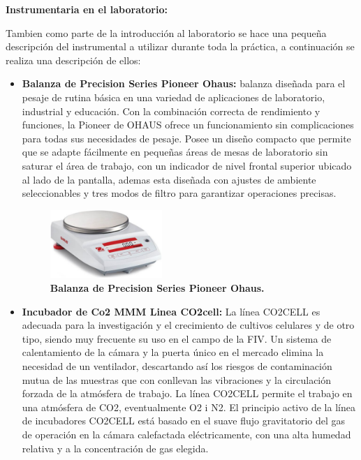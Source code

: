 \textbf{\textcolor{azul50}{Instrumentaria en el laboratorio:}}

Tambien como parte de la introducción al laboratorio se hace una pequeña descripción del instrumental a utilizar durante toda la práctica, a continuación se realiza una descripción de ellos:
 \begin{itemize}
     \item \textbf{\textbf{\textcolor{morado}{Balanza de Precision Series Pioneer Ohaus:}}} balanza diseñada para el pesaje de rutina básica en una variedad de aplicaciones de laboratorio, industrial y educación. Con la combinación correcta de rendimiento y funciones, la Pioneer de OHAUS ofrece un funcionamiento sin complicaciones para todas sus necesidades de pesaje. Posee un diseño compacto que permite que se adapte fácilmente en pequeñas áreas de mesas de laboratorio sin saturar el área de trabajo, con un indicador de nivel frontal superior ubicado al lado de la pantalla, ademas esta diseñada con ajustes de ambiente seleccionables y tres modos de filtro para garantizar operaciones precisas.%
     \begin{figure}
            \includegraphics[width=0.4\textwidth]{Tarea1/balanza.png}
        \caption{\textbf{Balanza de Precision Series Pioneer Ohaus.}}
        \label{balanza}
    \end{figure}
     \item \textbf{\textbf{\textcolor{morado}{Incubador de Co2 MMM Linea CO2cell:}}} La línea CO2CELL es adecuada para la investigación y el crecimiento de cultivos celulares y de otro tipo, siendo muy frecuente su uso en el campo de la FIV. Un sistema de calentamiento de la cámara y la puerta único en el mercado elimina la necesidad de un ventilador, descartando así los riesgos de contaminación mutua de las muestras que con conllevan las vibraciones y la circulación forzada de la atmósfera de trabajo. La línea CO2CELL permite el trabajo en una atmósfera de CO2, eventualmente O2 i N2. El principio activo de la línea de incubadores CO2CELL está basado en el suave flujo gravitatorio del gas de operación en la cámara calefactada eléctricamente, con una alta humedad relativa y a la concentración de gas elegida.

\end{itemize}
